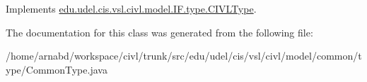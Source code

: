 Implements \hyperlink{interfaceedu_1_1udel_1_1cis_1_1vsl_1_1civl_1_1model_1_1IF_1_1type_1_1CIVLType_a19c0d27e2f4daf676a82a20727f2cd55}{edu.\+udel.\+cis.\+vsl.\+civl.\+model.\+I\+F.\+type.\+C\+I\+V\+L\+Type}.



The documentation for this class was generated from the following file\+:\begin{DoxyCompactItemize}
\item 
/home/arnabd/workspace/civl/trunk/src/edu/udel/cis/vsl/civl/model/common/type/Common\+Type.\+java\end{DoxyCompactItemize}
